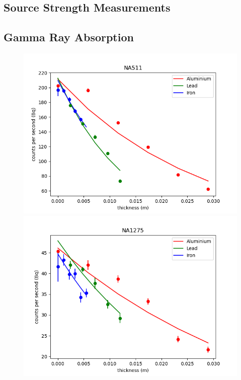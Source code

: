 \documentclass[11pt]{article} %
\begin{document}
    \subsection{Source Strength Measurements}
    \subsection{Gamma Ray Absorption}
        \begin{figure}[H] \centering \label{exponentials}
            \includegraphics[scale=0.4]{assets/NA511.png}
            \includegraphics[scale=0.4]{assets/NA1275.png}

\end{figure}
\end{document}
